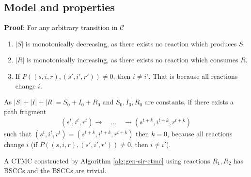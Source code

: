 \subsection{Model and properties}
\begin{theorem}[Acyclicity]}
    A CTMC $\mathcal{C}$ constructed by Algorithm \ref{alg:gen-sir-ctmc} using reactions
    $R_1, R_2$ is acyclic.
\end{theorem}
\textbf{Proof}: For any arbitrary transition in $\mathcal{C}$
\begin{enumerate}
    \item $|S|$ is monotonically decreasing, as there exists no reaction which produces $S$.
    \item $|R|$ is monotonically increasing, as there exists no reaction which consumes $R$.
    \item If $P((s,i,r), (s',i',r'))\neq 0$, then $i \neq i'$. That is because all reactions change $i$.
\end{enumerate}
As $|S| + |I| + |R| = S_0 + I_0 + R_0$ and $S_0,I_0,R_0$ are constants, if there exists a path fragment
\begin{align*}
    (s^t,i^t,r^t)\rightarrow \quad \ldots \quad \rightarrow(s^{t+k},i^{t+k},r^{t+k})
\end{align*}
such that $(s^t,i^t,r^t) = (s^{t+k},i^{t+k},r^{t+k})$ then $k=0$, because all reactions change $i$
(if $P((s,i,r), (s',i',r'))\neq 0$, then $i \neq i'$). \QED
\begin{corollary}
    A CTMC constructed by Algorithm \ref{alg:gen-sir-ctmc} using reactions $R_1, R_2$ has BSCCs
    and the BSCCs are trivial.
\end{corollary}

